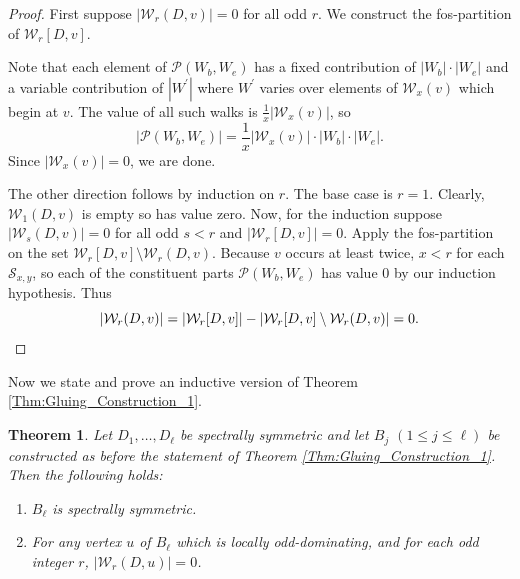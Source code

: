 \documentclass[11pt]{article}
\theoremstyle{plain}
\newtheorem{theorem}{Theorem}[section]
\newcommand{\ssym}[0]{spectrally symmetric }
\newcommand{\ssymend}[0]{spectrally symmetric}
\newcommand{\W}[0]{\mathcal{W}}
\renewcommand{\P}[0]{\mathcal{P}}
\renewcommand{\S}[0]{\mathcal{S}}
\begin{document}
\begin{proof}
First suppose $|\W_r(D,v)|=0$ for all odd $r$. We construct the fos-partition of $\W_r[D,v]$.

Note that each element of $\P(W_b,W_e)$ has a fixed contribution of $|W_b|\cdot|W_e|$ and a variable contribution of $|W^\prime|$ where $W^\prime$ varies over elements of $\W_x(v)$ which begin at $v$. The value of all such walks is $\frac{1}{x}|\W_x(v)|$, so \[|\P(W_b,W_e)|=\frac{1}{x}|\W_x(v)|\cdot|W_b|\cdot|W_e|.\] 
Since $|\W_{x}(v)|=0$, we are done.

The other direction follows by induction on $r$. The base case is $r=1$. Clearly, $\W_1(D,v)$ is empty so has value zero. Now, for the induction suppose $|\W_s(D,v)|=0$ for all odd $s<r$ and $|\W_r[D,v]|=0$. Apply the fos-partition on the set $\W_r[D,v]\setminus\W_r(D,v)$. Because $v$ occurs at least twice, $x<r$ for each $\S_{x,y}$, so each of the constituent parts $\P(W_b,W_e)$ has value $0$ by our induction hypothesis. Thus \[|\W_r(D,v)|=|\W_r[D,v]|-|\W_r[D,v]\setminus\W_r(D,v)|=0.\qedhere\]  
\end{proof}



Now we state and prove an inductive version of Theorem \ref{Thm:Gluing_Construction_1}.


\begin{theorem}\label{Thm:ind_gluing}
Let $D_1,\dots,D_\ell$ be \ssym and let $B_j$ $(1\leq j\leq \ell)$ be constructed as before the statement of Theorem \ref{Thm:Gluing_Construction_1}. Then the following holds:
\begin{enumerate}
    \item[(i)] $B_\ell$ is \ssymend.
    \item[(ii)] For any vertex $u$ of $B_\ell$ which is locally odd-dominating, and for each odd integer $r$, $|\W_r(D,u)|=0$.
\end{enumerate}
\end{theorem}
\end{document}
